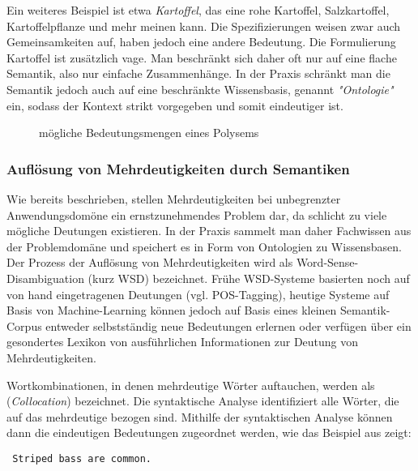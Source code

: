 \documentclass[12pt]{paper}
\begin{document}
Ein weiteres Beispiel ist etwa \textit{Kartoffel}, das eine rohe Kartoffel, Salzkartoffel, Kartoffelpflanze und mehr meinen kann. Die Spezifizierungen weisen zwar auch Gemeinsamkeiten auf, haben jedoch eine andere Bedeutung. Die Formulierung Kartoffel ist zusätzlich vage.
Man beschränkt sich daher oft nur auf eine flache Semantik, also nur einfache Zusammenhänge. In der Praxis schränkt man die Semantik jedoch auch auf eine beschränkte Wissensbasis, genannt \textit{"Ontologie"} ein, sodass der Kontext strikt vorgegeben und somit eindeutiger ist.

\begin{figure}
\caption{mögliche Bedeutungsmengen eines Polysems}
\end{figure}

\subsubsection{Auflösung von Mehrdeutigkeiten durch Semantiken}
Wie bereits beschrieben, stellen Mehrdeutigkeiten bei unbegrenzter Anwendungsdomöne ein ernstzunehmendes Problem dar, da schlicht zu viele mögliche Deutungen existieren. In der Praxis sammelt man daher Fachwissen aus der Problemdomäne und speichert es in Form von Ontologien zu Wissensbasen. Der Prozess der Auflösung von Mehrdeutigkeiten wird als Word-Sense-Disambiguation (kurz WSD) bezeichnet. Frühe WSD-Systeme basierten noch auf von hand eingetragenen Deutungen (vgl. POS-Tagging), heutige Systeme auf Basis von Machine-Learning können jedoch auf Basis eines kleinen Semantik-Corpus entweder selbstständig neue Bedeutungen erlernen oder verfügen über ein gesondertes Lexikon von ausführlichen Informationen zur Deutung von Mehrdeutigkeiten. 

Wortkombinationen, in denen mehrdeutige Wörter auftauchen, werden als (\textit{Collocation}) bezeichnet. Die syntaktische Analyse identifiziert alle Wörter, die auf das mehrdeutige bezogen sind. Mithilfe der syntaktischen Analyse können dann die eindeutigen Bedeutungen zugeordnet werden, wie das Beispiel aus \cite{cop04} zeigt:

\tt
Striped bass are common.
\end{document}
